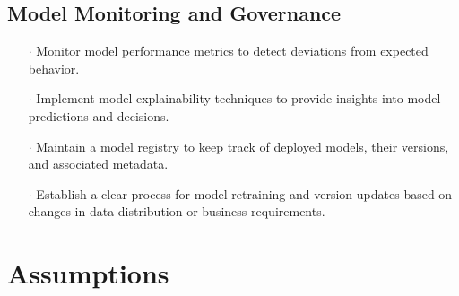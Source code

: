 \documentclass{report}
\begin{document}
\subsection{Model Monitoring and Governance}

\begin{itemize}
    \item[$\cdot$] Monitor model performance metrics to detect deviations from expected behavior.
    \item[$\cdot$] Implement model explainability techniques to provide insights into model predictions and decisions.
    \item[$\cdot$] Maintain a model registry to keep track of deployed models, their versions, and associated metadata.
    \item[$\cdot$] Establish a clear process for model retraining and version updates based on changes in data distribution or business requirements.
\end{itemize}

\section{Assumptions}
\end{document}

